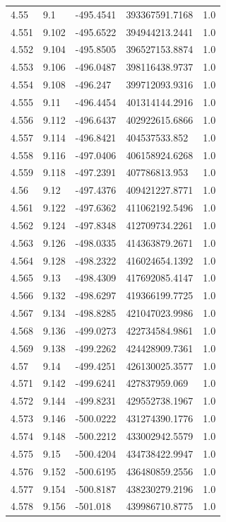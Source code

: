 \begin{tabular}{lllll}
4.55 & 9.1 & -495.4541 & 393367591.7168 & 1.0 \\
4.551 & 9.102 & -495.6522 & 394944213.2441 & 1.0 \\
4.552 & 9.104 & -495.8505 & 396527153.8874 & 1.0 \\
4.553 & 9.106 & -496.0487 & 398116438.9737 & 1.0 \\
4.554 & 9.108 & -496.247 & 399712093.9316 & 1.0 \\
4.555 & 9.11 & -496.4454 & 401314144.2916 & 1.0 \\
4.556 & 9.112 & -496.6437 & 402922615.6866 & 1.0 \\
4.557 & 9.114 & -496.8421 & 404537533.852 & 1.0 \\
4.558 & 9.116 & -497.0406 & 406158924.6268 & 1.0 \\
4.559 & 9.118 & -497.2391 & 407786813.953 & 1.0 \\
4.56 & 9.12 & -497.4376 & 409421227.8771 & 1.0 \\
4.561 & 9.122 & -497.6362 & 411062192.5496 & 1.0 \\
4.562 & 9.124 & -497.8348 & 412709734.2261 & 1.0 \\
4.563 & 9.126 & -498.0335 & 414363879.2671 & 1.0 \\
4.564 & 9.128 & -498.2322 & 416024654.1392 & 1.0 \\
4.565 & 9.13 & -498.4309 & 417692085.4147 & 1.0 \\
4.566 & 9.132 & -498.6297 & 419366199.7725 & 1.0 \\
4.567 & 9.134 & -498.8285 & 421047023.9986 & 1.0 \\
4.568 & 9.136 & -499.0273 & 422734584.9861 & 1.0 \\
4.569 & 9.138 & -499.2262 & 424428909.7361 & 1.0 \\
4.57 & 9.14 & -499.4251 & 426130025.3577 & 1.0 \\
4.571 & 9.142 & -499.6241 & 427837959.069 & 1.0 \\
4.572 & 9.144 & -499.8231 & 429552738.1967 & 1.0 \\
4.573 & 9.146 & -500.0222 & 431274390.1776 & 1.0 \\
4.574 & 9.148 & -500.2212 & 433002942.5579 & 1.0 \\
4.575 & 9.15 & -500.4204 & 434738422.9947 & 1.0 \\
4.576 & 9.152 & -500.6195 & 436480859.2556 & 1.0 \\
4.577 & 9.154 & -500.8187 & 438230279.2196 & 1.0 \\
4.578 & 9.156 & -501.018 & 439986710.8775 & 1.0 \\

\end{tabular}
